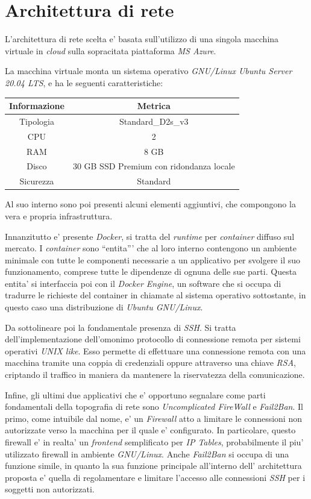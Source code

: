 \documentclass[a4paper]{report}
\newcommand{\quotes}[1]{``#1''}
\begin{document}
	\section{Architettura di rete}\label{architettura_di_rete}
		L'architettura di rete scelta e' basata sull'utilizzo di una singola macchina virtuale in \emph{cloud} sulla
		sopracitata piattaforma \emph{MS Azure}.

		La macchina virtuale monta un sistema operativo \emph{GNU/Linux Ubuntu Server 20.04 LTS}, e ha le seguenti
		caratteristiche:
		\begin{center}
			\begin{tabular}{c c}
				Informazione & Metrica \\
				\midrule
				Tipologia & Standard\_D2s\_v3 \\
				CPU & 2 \\
				RAM & 8 GB \\
				Disco & 30 GB SSD Premium con ridondanza locale \\
				Sicurezza & Standard \\
			\end{tabular}
		\end{center}

		Al suo interno sono poi presenti alcuni elementi aggiuntivi, che compongono la vera e propria infrastruttura.

		Innanzitutto e' presente \emph{Docker}, si tratta del \emph{runtime} per \emph{container} diffuso
		sul mercato. I \emph{container} sono \quotes{entita'} che al loro interno contengono un ambiente minimale con
		tutte le componenti necessarie a un applicativo per svolgere il suo funzionamento, comprese tutte le dipendenze
		di ognuna delle sue parti. Questa entita' si interfaccia poi con il \emph{Docker Engine}, un software che si
		occupa di tradurre le richieste del container in chiamate al sistema operativo sottostante, in questo caso una
		distribuzione di \emph{Ubuntu GNU/Linux}.

		Da sottolineare poi la fondamentale presenza di \emph{SSH}\label{SSH}. Si tratta dell'implementazione
		dell'omonimo protocollo di connessione remota per sistemi operativi \emph{UNIX like}. Esso permette di
		effettuare una connessione remota con una macchina tramite una coppia di credenziali oppure attraverso una chiave
		\emph{RSA}, criptando il traffico in maniera da mantenere la riservatezza della comunicazione.

		Infine, gli ultimi due applicativi che e' opportuno segnalare come parti fondamentali della topografia di rete
		sono \emph{Uncomplicated FireWall} e \emph{Fail2Ban}. Il primo, come intuibile dal nome, e' un \emph{Firewall}
		atto a limitare le connessioni non autorizzate verso la macchina per il quale e' configurato. In particolare,
		questo firewall e' in realta' un \emph{frontend} semplificato per \emph{IP Tables}, probabilmente il piu'
		utilizzato firewall in ambiente \emph{GNU/Linux}.
		Anche \emph{Fail2Ban} si occupa di una funzione simile, in quanto la sua funzione principale all'interno dell'
		architettura proposta e' quella di regolamentare e limitare l'accesso alle connessioni \emph{SSH} per i soggetti
		non autorizzati.
\end{document}
